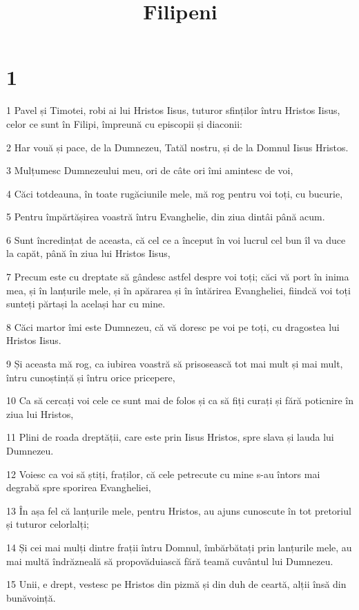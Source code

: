 

\title{Filipeni}


\chapter{1}

\par 1 Pavel și Timotei, robi ai lui Hristos Iisus, tuturor sfinților întru Hristos Iisus, celor ce sunt în Filipi, împreună cu episcopii și diaconii:
\par 2 Har vouă și pace, de la Dumnezeu, Tatăl nostru, și de la Domnul Iisus Hristos.
\par 3 Mulțumesc Dumnezeului meu, ori de câte ori îmi amintesc de voi,
\par 4 Căci totdeauna, în toate rugăciunile mele, mă rog pentru voi toți, cu bucurie,
\par 5 Pentru împărtășirea voastră întru Evanghelie, din ziua dintâi până acum.
\par 6 Sunt încredințat de aceasta, că cel ce a început în voi lucrul cel bun îl va duce la capăt, până în ziua lui Hristos Iisus,
\par 7 Precum este cu dreptate să gândesc astfel despre voi toți; căci vă port în inima mea, și în lanțurile mele, și în apărarea și în întărirea Evangheliei, fiindcă voi toți sunteți părtași la același har cu mine.
\par 8 Căci martor îmi este Dumnezeu, că vă doresc pe voi pe toți, cu dragostea lui Hristos Iisus.
\par 9 Și aceasta mă rog, ca iubirea voastră să prisosească tot mai mult și mai mult, întru cunoștință și întru orice pricepere,
\par 10 Ca să cercați voi cele ce sunt mai de folos și ca să fiți curați și fără poticnire în ziua lui Hristos,
\par 11 Plini de roada dreptății, care este prin Iisus Hristos, spre slava și lauda lui Dumnezeu.
\par 12 Voiesc ca voi să știți, fraților, că cele petrecute cu mine s-au întors mai degrabă spre sporirea Evangheliei,
\par 13 În așa fel că lanțurile mele, pentru Hristos, au ajuns cunoscute în tot pretoriul și tuturor celorlalți;
\par 14 Și cei mai mulți dintre frații întru Domnul, îmbărbătați prin lanțurile mele, au mai multă îndrăzneală să propovăduiască fără teamă cuvântul lui Dumnezeu.
\par 15 Unii, e drept, vestesc pe Hristos din pizmă și din duh de ceartă, alții însă din bunăvoință.
